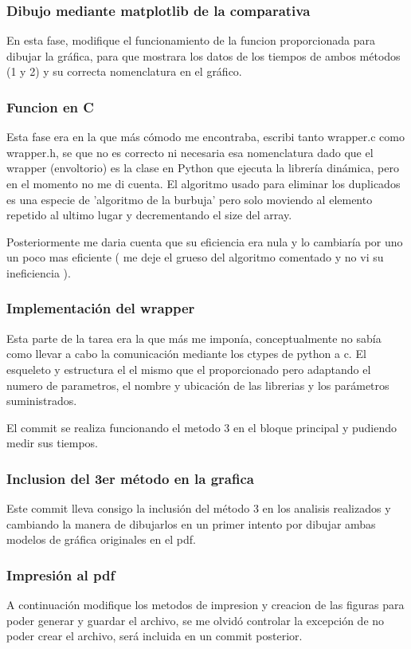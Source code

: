 \documentclass[10pt,journal,compsoc]{IEEEtran}
\begin{document}
\subsubsection{Dibujo mediante matplotlib de la comparativa}
En esta fase, modifique el funcionamiento de la funcion proporcionada para dibujar la gráfica, para que mostrara los datos de los tiempos de ambos métodos (1 y 2) y su correcta nomenclatura en el gráfico.

\subsubsection{Funcion en C}
Esta fase era en la que más cómodo me encontraba, escribi tanto wrapper.c como wrapper.h, se que no es correcto ni necesaria esa nomenclatura dado que el wrapper (envoltorio) es la clase en Python que ejecuta la librería dinámica, pero en el momento no me di cuenta.
El algoritmo usado para eliminar los duplicados es una especie de 'algoritmo de la burbuja' pero solo moviendo al elemento repetido al ultimo lugar y decrementando el size del array.

Posteriormente me daria cuenta que su eficiencia era nula y lo cambiaría por uno un poco mas eficiente ( me deje el grueso del algoritmo comentado y no vi su ineficiencia ).

\subsubsection{Implementación del wrapper}
Esta parte de la tarea era la que más me imponía, conceptualmente no sabía como llevar a cabo la comunicación mediante los ctypes de python a c.
El esqueleto y estructura el el mismo que el proporcionado pero adaptando el numero de parametros, el nombre y ubicación de las librerias y los parámetros suministrados.

El commit se realiza funcionando el metodo 3 en el bloque principal y pudiendo medir sus tiempos.

\subsubsection{Inclusion del 3er método en la grafica}
Este commit lleva consigo la inclusión del método 3 en los analisis realizados y cambiando la manera de dibujarlos en un primer intento por dibujar ambas modelos de gráfica originales en el pdf.

\subsubsection{Impresión al pdf}
A continuación modifique los metodos de impresion y creacion de las figuras para poder generar y guardar el archivo, se me olvidó controlar la excepción de no poder crear el archivo, será incluida en un commit posterior.
\end{document}
